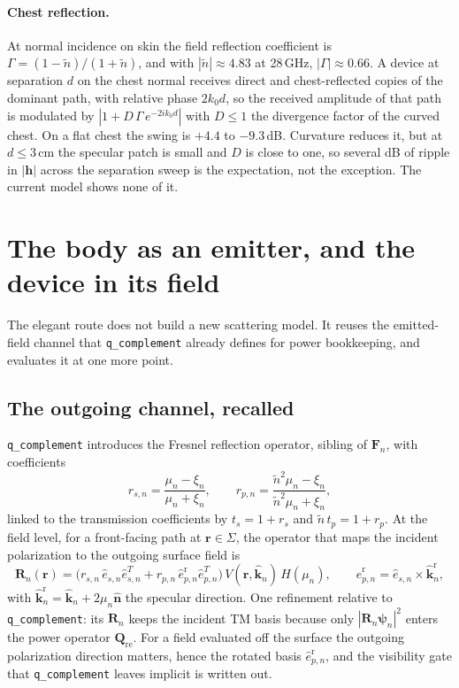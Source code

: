 \documentclass[11pt]{article}
\newcommand{\khat}{\hat{\bm{k}}}
\newcommand{\nhat}{\hat{\bm{n}}}
\newcommand{\rr}{\mathbf{r}}
\newcommand{\hh}{\mathbf{h}}
\newcommand{\Qref}{\mathbf{Q}_{\mathrm{re}}}
\newcommand{\Fn}{\mathbf{F}_n}
\newcommand{\Rn}{\mathbf{R}_n}
\newcommand{\psin}{\bm{\psi}_n}
\newcommand{\ntilde}{\tilde{n}}
\newcommand{\Vis}{V}
\theoremstyle{remark}
\begin{document}
\paragraph{Chest reflection.}
At normal incidence on skin the field reflection coefficient is
$\Gamma = (1 - \ntilde)/(1 + \ntilde)$, and with
$|\ntilde| \approx 4.83$ at 28\,GHz, $|\Gamma| \approx 0.66$. A device
at separation $d$ on the chest normal receives direct and
chest-reflected copies of the dominant path, with relative phase
$2 k_0 d$, so the received amplitude of that path is modulated by
$|1 + D\,\Gamma\, e^{-2 i k_0 d}|$ with $D \le 1$ the divergence
factor of the curved chest. On a flat chest the swing is $+4.4$ to
$-9.3$\,dB. Curvature reduces it, but at $d \le 3$\,cm the specular
patch is small and $D$ is close to one, so several dB of ripple in
$|\hh|$ across the separation sweep is the expectation, not the
exception. The current model shows none of it.

\section{The body as an emitter, and the device in its field}
\label{sec:emitter}

The elegant route does not build a new scattering model. It reuses
the emitted-field channel that \texttt{q\_complement} already defines
for power bookkeeping, and evaluates it at one more point.

\subsection{The outgoing channel, recalled}

\texttt{q\_complement} introduces the Fresnel reflection operator,
sibling of $\Fn$, with coefficients
\begin{equation}\label{eq:r-coef}
  r_{s,n} = \frac{\mu_n - \xi_n}{\mu_n + \xi_n},
  \qquad
  r_{p,n} = \frac{\ntilde^2 \mu_n - \xi_n}{\ntilde^2 \mu_n + \xi_n},
\end{equation}
linked to the transmission coefficients by $t_{s} = 1 + r_{s}$ and
$\ntilde\, t_{p} = 1 + r_{p}$. At the field level, for a front-facing
path at $\rr \in \Sigma$, the operator that maps the incident
polarization to the outgoing surface field is
\begin{equation}\label{eq:Rn}
  \Rn(\rr) =
  \bigl(r_{s,n}\, \hat{e}_{s,n} \hat{e}_{s,n}^{T}
  + r_{p,n}\, \hat{e}_{p,n}^{\mathrm{r}} \hat{e}_{p,n}^{T}\bigr)\,
  \Vis(\rr, \khat_n)\, H(\mu_n),
  \qquad
  \hat{e}_{p,n}^{\mathrm{r}} = \hat{e}_{s,n} \times \khat_n^{\mathrm{r}},
\end{equation}
with $\khat_n^{\mathrm{r}} = \khat_n + 2 \mu_n \nhat$ the specular
direction. One refinement relative to \texttt{q\_complement}: its
$\Rn$ keeps the incident TM basis because only $|\Rn \psin|^2$ enters
the power operator $\Qref$. For a field evaluated off the surface the
outgoing polarization direction matters, hence the rotated basis
$\hat{e}_{p,n}^{\mathrm{r}}$, and the visibility gate that
\texttt{q\_complement} leaves implicit is written out.
\end{document}
